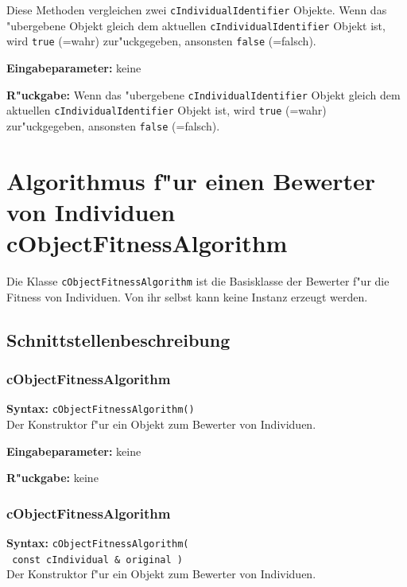 \bigskip\noindent
Diese Methoden vergleichen zwei \verb|cIndividualIdentifier| Objekte. Wenn das "ubergebene Objekt gleich dem aktuellen \verb|cIndividualIdentifier| Objekt ist, wird \verb|true| (=wahr) zur"uckgegeben, ansonsten \verb|false| (=falsch).

\bigskip\noindent
\textbf{Eingabeparameter:} keine

\bigskip\noindent
\textbf{R"uckgabe:} Wenn das "ubergebene \verb|cIndividualIdentifier| Objekt gleich dem aktuellen \verb|cIndividualIdentifier| Objekt ist, wird \verb|true| (=wahr) zur"uckgegeben, ansonsten \verb|false| (=falsch).


\section{Algorithmus f"ur einen Bewerter von Individuen cObjectFitnessAlgorithm}
\label{secCObjectFitnessAlgorithm}

Die Klasse \verb|cObjectFitnessAlgorithm| ist die Basisklasse der Bewerter f"ur die Fitness von Individuen. Von ihr selbst kann keine Instanz erzeugt werden.


\subsection{Schnittstellenbeschreibung}

\subsubsection{cObjectFitnessAlgorithm}

\textbf{Syntax:} \verb|cObjectFitnessAlgorithm()| \\

Der Konstruktor f"ur ein Objekt zum Bewerter von Individuen.

\bigskip\noindent
\textbf{Eingabeparameter:} keine

\bigskip\noindent
\textbf{R"uckgabe:} keine

\subsubsection{cObjectFitnessAlgorithm}

\textbf{Syntax:} \verb|cObjectFitnessAlgorithm(| \\\verb| const cIndividual & original )| \\

Der Konstruktor f"ur ein Objekt zum Bewerter von Individuen.

